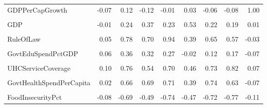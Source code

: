 \documentclass[
]{article}
\begin{document}
\begin{table}
{\begin{tabular}[t]{lrrrrrrrr}
\addlinespace
GDPPerCapGrowth & -0.07 & 0.12 & -0.12 & -0.01 & 0.03 & -0.06 & -0.08 & 1.00\\
\cellcolor{gray!10}{GDPGrowth} & \cellcolor{gray!10}{-0.01} & \cellcolor{gray!10}{-0.05} & \cellcolor{gray!10}{-0.16} & \cellcolor{gray!10}{-0.09} & \cellcolor{gray!10}{-0.01} & \cellcolor{gray!10}{-0.16} & \cellcolor{gray!10}{-0.16} & \cellcolor{gray!10}{0.96}\\
GDP & -0.01 & 0.24 & 0.37 & 0.23 & 0.53 & 0.22 & 0.19 & 0.01\\
\cellcolor{gray!10}{PoliticalStability} & \cellcolor{gray!10}{0.03} & \cellcolor{gray!10}{0.65} & \cellcolor{gray!10}{0.43} & \cellcolor{gray!10}{0.71} & \cellcolor{gray!10}{0.09} & \cellcolor{gray!10}{0.46} & \cellcolor{gray!10}{0.41} & \cellcolor{gray!10}{0.01}\\
RuleOfLaw & 0.05 & 0.78 & 0.70 & 0.94 & 0.39 & 0.65 & 0.57 & -0.03\\
\addlinespace
\cellcolor{gray!10}{RqdEduYears} & \cellcolor{gray!10}{-0.02} & \cellcolor{gray!10}{0.23} & \cellcolor{gray!10}{0.11} & \cellcolor{gray!10}{0.28} & \cellcolor{gray!10}{0.16} & \cellcolor{gray!10}{0.32} & \cellcolor{gray!10}{0.38} & \cellcolor{gray!10}{-0.05}\\
GovtEduSpendPctGDP & 0.06 & 0.36 & 0.32 & 0.27 & -0.02 & 0.12 & 0.17 & -0.07\\
\cellcolor{gray!10}{MortalityFromDirtyness} & \cellcolor{gray!10}{-0.12} & \cellcolor{gray!10}{NA} & \cellcolor{gray!10}{-0.23} & \cellcolor{gray!10}{-0.57} & \cellcolor{gray!10}{-0.27} & \cellcolor{gray!10}{-0.56} & \cellcolor{gray!10}{-0.76} & \cellcolor{gray!10}{-0.06}\\
UHCServiceCoverage & 0.10 & 0.76 & 0.54 & 0.70 & 0.46 & 0.73 & 0.82 & 0.07\\
\cellcolor{gray!10}{HealthSpendPerCapita} & \cellcolor{gray!10}{0.01} & \cellcolor{gray!10}{0.66} & \cellcolor{gray!10}{0.71} & \cellcolor{gray!10}{0.72} & \cellcolor{gray!10}{0.43} & \cellcolor{gray!10}{0.75} & \cellcolor{gray!10}{0.64} & \cellcolor{gray!10}{-0.07}\\
\addlinespace
GovtHealthSpendPerCapita & 0.02 & 0.66 & 0.69 & 0.71 & 0.39 & 0.74 & 0.63 & -0.07\\
\cellcolor{gray!10}{MigrantsPct} & \cellcolor{gray!10}{0.61} & \cellcolor{gray!10}{NA} & \cellcolor{gray!10}{0.21} & \cellcolor{gray!10}{0.43} & \cellcolor{gray!10}{0.17} & \cellcolor{gray!10}{0.35} & \cellcolor{gray!10}{0.37} & \cellcolor{gray!10}{-0.06}\\
FoodInsecurityPct & -0.08 & -0.69 & -0.49 & -0.74 & -0.47 & -0.72 & -0.77 & -0.11\\

\end{tabular}}
\end{table}
\end{document}
